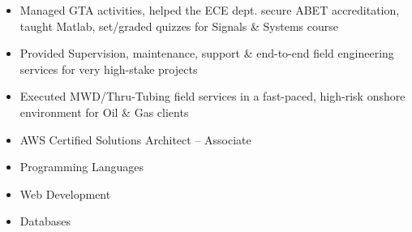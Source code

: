 \documentclass[10pt,a4paper,ragged2e,withhyper]{altacv}
\begin{document}
\begin{paracol}{2}
\divider

\begin{itemize}
\item Managed GTA activities, helped the ECE dept. secure ABET accreditation, taught Matlab, set/graded quizzes for Signals \& Systems course
\end{itemize}

\divider

\begin{itemize}
\item Provided Supervision, maintenance, support \& end-to-end field engineering services for very high-stake projects
\item Executed MWD/Thru-Tubing field services in a fast-paced, high-risk onshore environment for Oil \& Gas clients
\end{itemize}



\newpage

\switchcolumn

\begin{itemize}
\item AWS Certified Solutions Architect – Associate                           
\end{itemize}



\begin{itemize}
\item \textcolor{emphasis}{Programming Languages} 
\end{itemize}

\vskip 0.2cm

\begin{itemize}
\item \textcolor{emphasis}{Web Development} 
\end{itemize}

\vskip 0.2cm

\begin{itemize}
\item \textcolor{emphasis}{Databases} 
\end{itemize}


\end{paracol}
\end{document}
